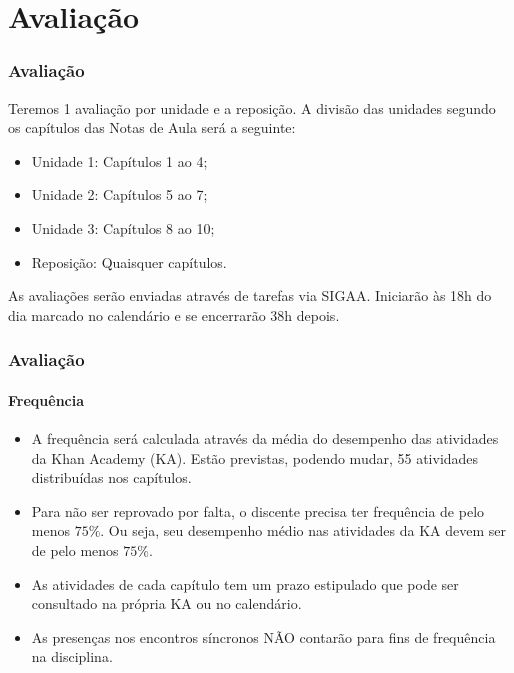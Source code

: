 \section{Avaliação}


\begin{frame}
	\frametitle{Avaliação}

	Teremos 1 avaliação por unidade e a reposição. A divisão das unidades segundo os capítulos das Notas de Aula será a seguinte:
	\begin{itemize}
		\item Unidade 1: Capítulos 1 ao 4;
		\item Unidade 2: Capítulos 5 ao 7;
		\item Unidade 3: Capítulos 8 ao 10;
		\item Reposição: Quaisquer capítulos.
	\end{itemize}\pause

	As avaliações serão enviadas através de tarefas via SIGAA. Iniciarão às 18h do dia marcado no calendário e se encerrarão 38h depois.
\end{frame}


\begin{frame}
	\frametitle{Avaliação}
	\framesubtitle{Frequência}

	\begin{itemize}
		\item A frequência será calculada através da média do desempenho das atividades da Khan Academy (KA). Estão previstas, podendo mudar, 55 atividades distribuídas nos capítulos.
		\item Para não ser reprovado por falta, o discente precisa ter frequência de pelo menos $75\%$. Ou seja, seu desempenho médio nas atividades da KA devem ser de pelo menos $75\%$.
		\item As atividades de cada capítulo tem um prazo estipulado que pode ser consultado na própria KA ou no calendário. \pause
		\item As presenças nos encontros síncronos NÃO contarão para fins de frequência na disciplina.
	\end{itemize}
		
\end{frame}
